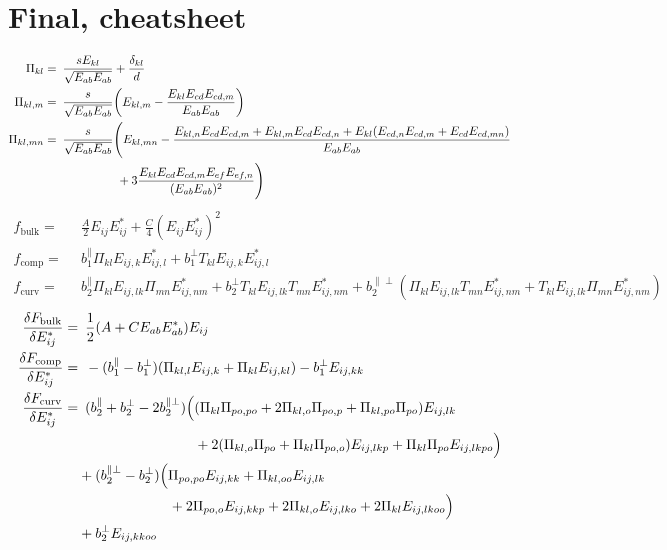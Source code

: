 \documentclass[11pt]{article}
\begin{document}
\section{Final, cheatsheet}
\begin{align}
    \Pi_{kl} =&\enspace \frac{s E_{kl}}{\sqrt{E_{ab}E_{ab}}} + \frac{\delta_{kl}}{d} \\
    \Pi_{kl,m} =&\enspace \frac{s}{\sqrt{E_{ab}E_{ab}}} \qty(E_{kl,m} - \frac{E_{kl}E_{cd}E_{cd,m}}{E_{ab}E_{ab}}) \\
    \Pi_{kl,mn} =&\enspace \frac{s}{\sqrt{E_{ab}E_{ab}}} \Biggl(E_{kl,mn} - \frac{E_{kl,n}E_{cd}E_{cd,m} + E_{kl,m}E_{cd}E_{cd,n} + E_{kl}(E_{cd,n}E_{cd,m} + E_{cd}E_{cd,mn})}{E_{ab}E_{ab}} \\
    &\phantom{\frac{s}{\sqrt{E_{ab}E_{ab}}} \Biggl(} + 3\frac{E_{kl}E_{cd}E_{cd,m}E_{ef}E_{ef,n}}{(E_{ab}E_{ab})^2} \Biggr)
\end{align}
\begin{align}
    f_\text{bulk} =&\enspace \frac{A}{2} E_{ij}E_{ij}^* + \frac{C}{4} (E_{ij}E_{ij}^*)^2 \\
    f_\text{comp} =&\enspace b_1^\parallel \Pi_{kl} E_{ij,k}E_{ij,l}^* + b_1^\perp T_{kl} E_{ij,k}E_{ij,l}^* \\
    f_\text{curv} =&\enspace b_2^\parallel \Pi_{kl}E_{ij,lk}\Pi_{mn}E_{ij,nm}^* + b_2^\perp T_{kl}E_{ij,lk}T_{mn}E_{ij,nm}^* + b_2^{\parallel\perp}(\Pi_{kl}E_{ij,lk}T_{mn}E_{ij,nm}^* + T_{kl}E_{ij,lk}\Pi_{mn}E_{ij,nm}^*)
\end{align}
\begin{align}
    \fdv{F_\text{bulk}}{E_{ij}^*} =&\enspace \frac{1}{2}\qty(A + C E_{ab}E_{ab}^*)E_{ij} \\
    \fdv{F_\text{comp}}{E_{ij}^*} =&\enspace -(b_1^\parallel - b_1^\perp) (\Pi_{kl,l} E_{ij,k} + \Pi_{kl} E_{ij,kl}) - b_1^\perp E_{ij,kk} \\
    \fdv{F_\text{curv}}{E_{ij}^*} =&\enspace (b_2^\parallel + b_2^\perp - 2b_2^{\parallel\perp}) \Bigl( (\Pi_{kl}\Pi_{po,po} + 2\Pi_{kl,o}\Pi_{po,p} + \Pi_{kl,po}\Pi_{po})E_{ij,lk} \\
    &\phantom{\enspace (b_2^\parallel + b_2^\perp - 2b_2^{\parallel\perp}) \Bigl(}+ 2(\Pi_{kl,o}\Pi_{po} + \Pi_{kl}\Pi_{po,o})E_{ij,lkp} + \Pi_{kl}\Pi_{po}E_{ij,lkpo} \Bigr) \nonumber \\
    &+ (b_2^{\parallel\perp} - b_2^\perp)\Bigl( \Pi_{po,po}E_{ij,kk} + \Pi_{kl,oo}E_{ij,lk} \nonumber \\ 
    &\phantom{\enspace+ (b_2^{\parallel\perp} - b_2^\perp)\Bigl(}+ 2\Pi_{po,o}E_{ij,kkp} + 2\Pi_{kl,o}E_{ij,lko} + 2\Pi_{kl}E_{ij,lkoo} \Bigr) \nonumber \\ 
    &+ b_2^\perp E_{ij,kkoo} \nonumber
\end{align}
\end{document}

